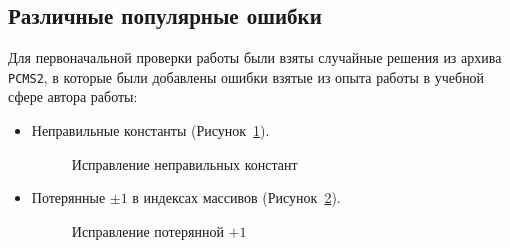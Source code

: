 \subsection{Различные популярные ошибки}
Для первоначальной проверки работы были взяты случайные решения из архива \texttt{PCMS2}, в которые были добавлены ошибки взятые из
опыта работы в учебной сфере автора работы:
\begin{itemize}
    \item Неправильные константы (Рисунок~\ref{figConst}).
        \begin{figure}[!h]
{\caption{Исправление неправильных констант}\label{figConst}}
\end{figure}

    \item Потерянные $\pm 1$ в индексах массивов (Рисунок~\ref{figInd}).
    
    \begin{figure}[!h]
{\caption{Исправление потерянной $+1$}\label{figInd}}
\end{figure}


\end{itemize}

